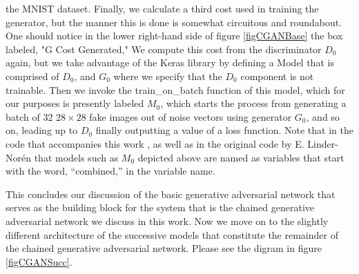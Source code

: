 \documentclass[conference]{IEEEtran}
\begin{document}
the MNIST dataset.  Finally, we calculate a third cost used in training the
generator, but the manner this is done is somewhat circuitous and roundabout.
One should notice in the lower right-hand side of figure \ref{figCGANBase} the
box labeled, "G Cost Generated," We compute this cost from the discriminator
$D_{0}$ again, but we take advantage of the Keras library by defining a Model
that is comprised of $D_{0}$, and $G_{0}$ where we specify that the $D_{0}$
component is not trainable.  Then we invoke the train\_on\_batch function of
this model, which for our purposes is presently labeled $M_{0}$, which starts
the process from generating a batch of 32 $28\times28$ fake images out of noise
vectors using generator $G_{0}$, and so on, leading up to $D_{0}$ finally
outputting a value of a loss function. Note that in the code that accompanies
this work \cite{jhcgan}, as well as in the original code by E. Linder-Nor\'en
that models such as $M_{0}$ depicted above are named as variables that start
with the word, ``combined,'' in the variable name.

This concludes our discussion of the basic generative adversarial network that
serves as the building block for the system that is the 
chained generative adversarial network  we discuss in this work.  Now we move on
to the slightly different architecture of the successive models that constitute
the remainder of the chained generative adversarial network.  Please see the
digram in figure \ref{figCGANSucc}.
\end{document}
